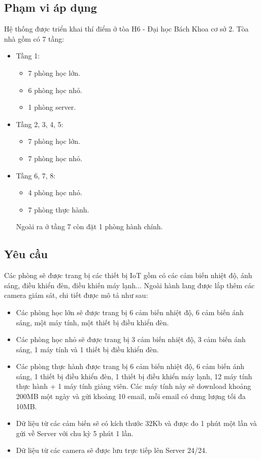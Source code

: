 \documentclass[12pt]{report}
\begin{document}
	\subsection{Phạm vi áp dụng}
		Hệ thống được triển khai thí điểm ở tòa H6 - Đại học Bách Khoa cơ sở 2. Tòa nhà gồm có 7 tầng:
		\begin{itemize}
			\item Tầng 1:
			\begin{itemize}
				\item 7 phòng học lớn.
				\item 6 phòng học nhỏ.
				\item 1 phòng server.
			\end{itemize}
			\item Tầng 2, 3, 4, 5:
			\begin{itemize}
				\item 7 phòng học lớn.
				\item 7 phòng học nhỏ.
			\end{itemize}
			\item Tầng 6, 7, 8:
			\begin{itemize}
				\item 4 phòng học nhỏ.
				\item 7 phòng thực hành.
			\end{itemize}
		Ngoài ra ở tầng 7 còn đặt 1 phòng hành chính.
		\end{itemize}
	
	\subsection{Yêu cầu}
		Các phòng sẽ được trang bị các thiết bị IoT gồm có các cảm biến nhiệt độ, ánh sáng, điều khiển đèn, điều khiến máy lạnh... Ngoài hành lang được lắp thêm các camera giám sát, chi tiết được mô tả như sau:
		\begin{itemize}
			\item Các phòng học lớn sẽ được trang bị 6 cảm biến nhiệt độ, 6 cảm biến ánh sáng, một máy tính, một thiết bị điều khiển đèn.
			\item Các phòng học nhỏ sẽ được trang bị 3 cảm biến nhiệt độ, 3 cảm biến ánh sáng, 1 máy tính và 1 thiết bị điều khiển đèn.
			\item Các phòng thực hành được trang bị 6 cảm biến nhiệt độ, 6 cảm biến ánh sáng, 1 thiết bị điều khiển đèn, 1 thiết bị điều khiển máy lạnh, 12 máy tính thực hành + 1 máy tính giảng viên. Các máy tính này sẽ download khoảng 200MB một ngày và gửi khoảng 10 email, mỗi email có dung lượng tối đa 10MB.
			\item Dữ liệu từ các cảm biến sẽ có kích thước 32Kb và được đo 1 phút một lần và gửi về Server với chu kỳ 5 phút 1 lần.
			\item Dữ liệu từ các camera sẽ được lưu trực tiếp lên Server 24/24.	
		\end{itemize}
	
\end{document}
